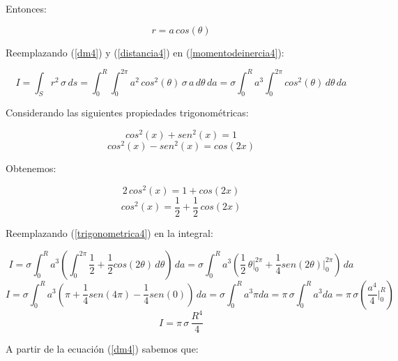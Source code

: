 \documentclass[letter,11pt]{article}
\begin{document}
Entonces:

\begin{equation}
    r = a\, cos (\theta)
\label{distancia4}
\end{equation}

Reemplazando (\ref{dm4}) y (\ref{distancia4}) en (\ref{momentodeinercia4}): 

\begin{equation*}
    I = \int_{S} r^2\, \sigma\, ds = \int_{0}^{R} \int_{0}^{2\pi} a^2\, cos^2(\theta)\, \sigma\, a\, d\theta\, da = \sigma \int_{0}^{R} a^3 \int_{0}^{2\pi} cos^2(\theta)\, d\theta\, da
\end{equation*}

Considerando las siguientes propiedades trigonométricas:

\begin{equation*}
    cos^2(x) + sen^2(x) = 1
\end{equation*}
\begin{equation*}
    cos^2(x) - sen^2(x) = cos(2x)
\end{equation*}

Obtenemos:

\begin{equation*}
    2\, cos^2(x) = 1 + cos(2x)
\end{equation*}
\begin{equation}
    cos^2(x) = \frac{1}{2} + \frac{1}{2}\, cos(2x)
\label{trigonometrica4}
\end{equation}

Reemplazando (\ref{trigonometrica4}) en la integral:

\begin{equation*}
    I = \sigma \int_{0}^{R} a^3 \left( \int_{0}^{2\pi} \frac{1}{2} + \frac{1}{2} cos(2\theta) \, d\theta \right) \, da = \sigma \int_{0}^{R} a^3 \left( \frac{1}{2}\, \theta \Biggr|_{0}^{2\pi} + \frac{1}{4} sen(2\theta) \Biggr|_{0}^{2\pi} \right) \, da 
\end{equation*}
\begin{equation*}
    I = \sigma \int_{0}^{R} a^3 \left( \pi + \frac{1}{4} sen(4\pi) - \frac{1}{4} sen(0) \right) \, da = \sigma \int_{0}^{R} a^3 \pi da = \pi\, \sigma \int_{0}^{R} a^3 da = \pi\, \sigma \left( \frac{a^4}{4} \Biggr|_{0}^{R} \right)
\end{equation*}
\begin{equation}
    I = \pi\, \sigma\, \frac{R^4}{4}
\label{resultado4}
\end{equation}

A partir de la ecuación (\ref{dm4}) sabemos que:
\end{document}
